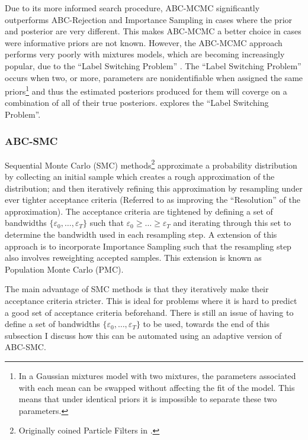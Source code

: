 \documentclass[11pt,a4paper]{article}
\theoremstyle{break}
\begin{document}
  \par Due to its more informed search procedure, ABC-MCMC significantly outperforms ABC-Rejection and Importance Sampling in cases where the prior and posterior are very different. This makes ABC-MCMC a better choice in cases were informative priors are not known. However, the ABC-MCMC approach performs very poorly with mixtures models, which are becoming increasingly popular, due to the ``Label Switching Problem'' \cite[]{mcmc_methods_and_the_label_switching_problem_in_bayesian_mixture_modeling}. The ``Label Switching Problem''  occurs when two, or more, parameters are nonidentifiable when assigned the same priors\footnote{In a Gaussian mixtures model with two mixtures, the parameters associated with each mean can be swapped without affecting the fit of the model. This means that under identical priors it is impossible to separate these two parameters.} and thus the estimated posteriors produced for them will coverge on a combination of all of their true posteriors. \cite[]{mcmc_methods_and_the_label_switching_problem_in_bayesian_mixture_modeling} explores the ``Label Switching Problem''.

\subsubsection{ABC-SMC}\label{sec_abc_smc}

  \par Sequential Monte Carlo (SMC) methods\footnote{Originally coined Particle Filters in \cite[]{non_linear_filtering_interacting_particle_resolution}.} approximate a probability distribution by collecting an initial sample which creates a rough approximation of the distribution; and then iteratively refining this approximation by resampling under ever tighter acceptance criteria (Referred to as improving the ``Resolution'' of the approximation). The acceptance criteria are tightened by defining a set of bandwidths $\{\varepsilon_0,\dots,\varepsilon_T\}$ such that $\varepsilon_0\geq\dots\geq\varepsilon_T$ and iterating through this set to determine the bandwidth used in each resampling step. A extension of this approach is to incorporate Importance Sampling such that the resampling step also involves reweighting accepted samples. This extension is known as Population Monte Carlo (PMC).

  \par The main advantage of SMC methods is that they iteratively make their acceptance criteria stricter. This is ideal for problems where it is hard to predict a good set of acceptance criteria beforehand. There is still an issue of having to define a set of bandwidths $\{\varepsilon_0,\dots,\varepsilon_T\}$ to be used, towards the end of this subsection I discuss how this can be automated using an adaptive version of ABC-SMC.
\end{document}
